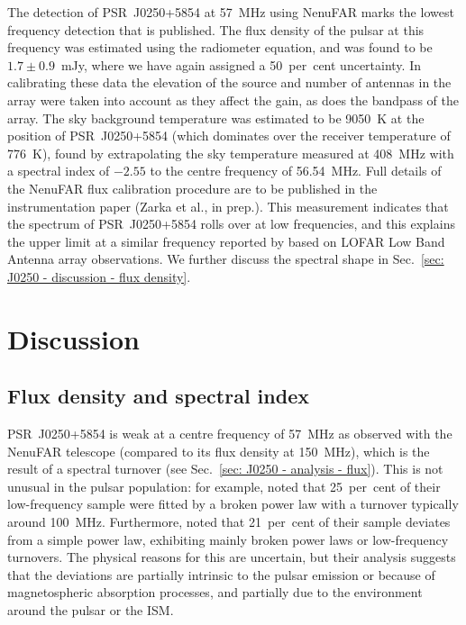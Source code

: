 The detection of PSR~J0250+5854 at 57~MHz using NenuFAR marks the lowest frequency detection that is published. The flux density of the pulsar at this frequency was estimated using the radiometer equation, and was found to be $1.7\pm0.9$~mJy, where we have again assigned a 50~per~cent uncertainty. In calibrating these data the elevation of the source and number of antennas in the array were taken into account as they affect the gain, as does the bandpass of the array. The sky background temperature was estimated to be 9050~K at the position of PSR~J0250+5854 (which dominates over the receiver temperature of 776~K), found by extrapolating the sky temperature measured at 408~MHz \citep{HSSW1982} with a spectral index of $-2.55$ \citep{LMOP1987, RRxx1988} to the centre frequency of 56.54~MHz. Full details of the NenuFAR flux calibration procedure are to be published in the instrumentation paper (Zarka et al., in prep.). This measurement indicates that the spectrum of PSR~J0250+5854 rolls over at low frequencies, and this explains the upper limit at a similar frequency reported by \citet{TBC+2018} based on LOFAR Low Band Antenna array observations. We further discuss the spectral shape in Sec.~\eqref{sec: J0250 - discussion - flux density}.








\section{Discussion}
\label{sec: J0250 - discussion}


\subsection{Flux density and spectral index}
\label{sec: J0250 - discussion - flux density}

PSR~J0250+5854 is weak at a centre frequency of 57~MHz as observed with the NenuFAR telescope (compared to its flux density at 150~MHz), which is the result of a spectral turnover (see Sec.~\ref{sec: J0250 - analysis - flux}). This is not unusual in the pulsar population: for example, \citet{BKK+2016} noted that 25~per~cent of their low-frequency sample were fitted by a broken power law with a turnover typically around 100~MHz. Furthermore, \citet{JSK+2018} noted that 21~per~cent of their sample deviates from a simple power law, exhibiting mainly broken power laws or low-frequency turnovers. The physical reasons for this are uncertain, but their analysis suggests that the deviations are partially intrinsic to the pulsar emission or because of magnetospheric absorption processes, and partially due to the environment around the pulsar or the ISM.

